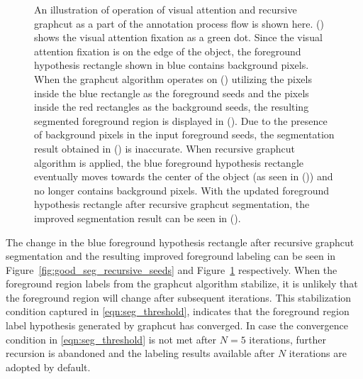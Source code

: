 \documentclass {udthesis}
\begin{document}
\begin{figure}
\begin{subfigure}[]{0.2\textwidth}
      \caption{}
      \label{fig:good_seg_recursive_seg}
  \end{subfigure}
\caption[Illustration of annotation process flow]{An illustration of operation of visual attention and recursive graphcut as a part of the annotation process flow is shown here. () shows the visual attention fixation as a green dot. Since the visual attention fixation is on the edge of the object, the foreground hypothesis rectangle shown in blue contains background pixels. When the graphcut algorithm operates on () utilizing the pixels inside the blue rectangle as the foreground seeds and the pixels inside the red rectangles as the background seeds, the resulting segmented foreground region is displayed in (). Due to the presence of background pixels in the input foreground seeds, the segmentation result obtained in () is inaccurate. When recursive graphcut algorithm is 
applied, the blue foreground hypothesis rectangle eventually moves towards the center of the object (as seen in ()) and no longer contains background pixels. With the updated foreground hypothesis rectangle after recursive graphcut segmentation, the improved segmentation result can be seen in ().}
\label{fig:annotation_good_seg}
\end{figure}	
%
The change in the blue foreground hypothesis rectangle after recursive graphcut segmentation and the resulting improved foreground labeling can be seen in Figure~\ref{fig:good_seg_recursive_seeds} and Figure~\ref{fig:good_seg_recursive_seg} respectively.
When the foreground region labels from the graphcut algorithm stabilize, it is unlikely that the foreground region will change after subsequent iterations. This stabilization condition captured in \eqref{eqn:seg_threshold}, indicates that the foreground region label hypothesis generated by graphcut has converged. In case the convergence condition in \eqref{eqn:seg_threshold} is not met after $N=5$ iterations, further recursion is abandoned and the labeling results available after $N$ iterations are adopted by default.
\end{document}
